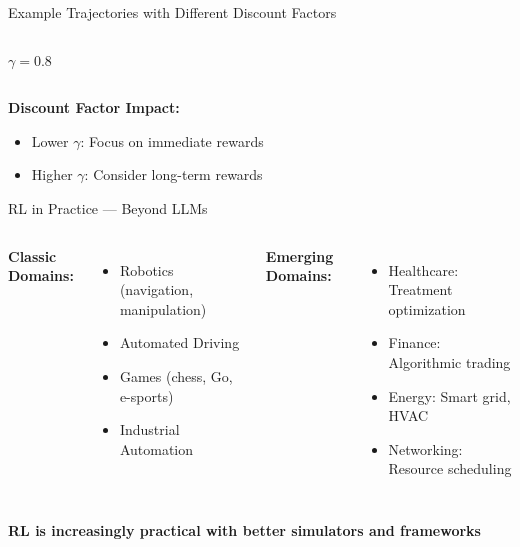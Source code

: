 \documentclass[aspectratio=169]{beamer}
\begin{document}
\begin{frame}{Example Trajectories with Different Discount Factors}
\begin{columns}
\begin{center}
      \textbf{$\gamma = 0.8$}
    \end{center}
  \end{columns}
  
  \vspace{0.5cm}
  \textbf{Discount Factor Impact:}
  \begin{itemize}
    \item Lower $\gamma$: Focus on immediate rewards
    \item Higher $\gamma$: Consider long-term rewards
  \end{itemize}
\end{frame}

\begin{frame}{RL in Practice — Beyond LLMs}
  \begin{columns}
    \textbf{Classic Domains:}
    \begin{itemize}
      \item Robotics (navigation, manipulation)
      \item Automated Driving
      \item Games (chess, Go, e-sports)
      \item Industrial Automation
    \end{itemize}

    \textbf{Emerging Domains:}
    \begin{itemize}
      \item Healthcare: Treatment optimization
      \item Finance: Algorithmic trading
      \item Energy: Smart grid, HVAC
      \item Networking: Resource scheduling
    \end{itemize}
  \end{columns}

  \vspace{0.5cm}
  \centering
  \textbf{RL is increasingly practical with better simulators and frameworks}
\end{frame}
\end{document}
